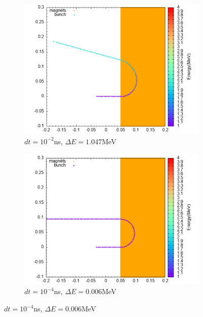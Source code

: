 \documentclass[a4paper,oneside,12pt]{report}
\numberwithin{equation}{chapter}
\begin{document}
{\iffalse \begin{figure}[H]
    \centering
    \begin{subfigure}{0.9\textwidth}
        \centering
        \includegraphics[width=\linewidth]{./figures/rhodoSim/mag_rk_001dt.png}
        \caption*{$dt=10^{-2}$ns, $\Delta E=1.047$MeV}
    \end{subfigure}
    \begin{subfigure}{0.9\textwidth}
        \centering
        \includegraphics[width=\linewidth]{./figures/rhodoSim/mag_rk_00001dt.png}
        \caption*{$dt=10^{-4}$ns, $\Delta E=0.006$MeV}
    \end{subfigure}

\end{figure}}
\end{document}
